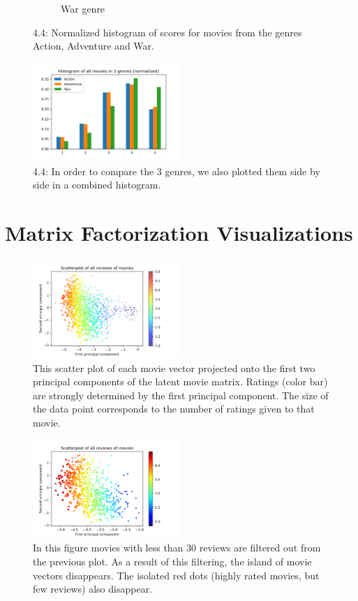 \documentclass{article}
\begin{document}
\begin{figure}[H]
\begin{subfigure}[t]{0.3\textwidth}
		\caption{War genre}
	\end{subfigure}
	\caption{4.4: Normalized histogram of scores for movies from the genres Action, Adventure and War.}
\end{figure}

	\begin{figure}[H]
	\centering
	\includegraphics[width=0.5\textwidth]{Fig4-4-4.png}
	\caption{4.4: In order to compare the 3 genres, we also plotted them side by side in a combined histogram.}
\end{figure}

\section{Matrix Factorization Visualizations}
\begin{figure}[H]
	\centering
	\includegraphics[width=0.5\textwidth]{ScoresRaw.png}
	\caption{This scatter plot of each movie vector projected onto the first two principal components of the latent movie matrix. Ratings (color bar) are strongly determined by the first principal component. The size of the data point corresponds to the number of ratings given to that movie.}
\end{figure}


\begin{figure}[H]
	\centering
	\includegraphics[width=0.5\textwidth]{Scores30Raw.png}
	\caption{In this figure movies with less than 30 reviews are filtered out from the previous plot. As a result of this filtering, the island of movie vectors disappears. The isolated red dots (highly rated movies, but few reviews) also disappear.}
\end{figure}
\end{document}
